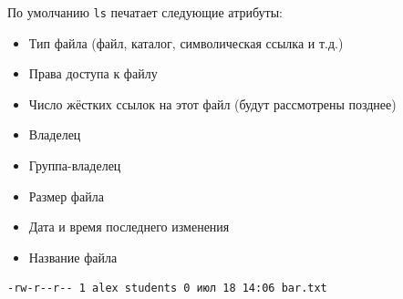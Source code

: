 \documentclass{beamer}
\begin{document}
\begin{frame}[fragile]
	По умолчанию \texttt{ls} печатает следующие атрибуты:%
	\begin{itemize}
		\item{Тип файла (файл, каталог, символическая ссылка и т.д.)}%
		\item{Права доступа к файлу}%
		\item{Число жёстких ссылок на этот файл (будут рассмотрены позднее)}%
		\item{Владелец}%
		\item{Группа-владелец}%
		\item{Размер файла}%
		\item{Дата и время последнего изменения}%
		\item{Название файла}%
	\end{itemize}
    
    \begin{Verbatim}[commandchars=\\\{\},codes={\catcode`$=3\catcode`^=7\catcode`_=8}]
-rw-r--r-- 1 alex students 0 июл 18 14:06 bar.txt
	\end{Verbatim}


\end{frame}
\end{document}

